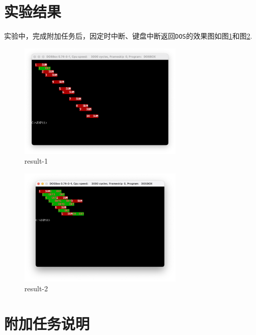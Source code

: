 \documentclass[11pt]{SEU-Digital-Report}
\begin{document}
\section{实验结果}
实验中，完成附加任务后，因定时中断、键盘中断返回\texttt{DOS}的效果图如图\ref{fig:rst1}和图\ref{fig:rst2}.
\begin{figure}[htbp]
    \centering
    \includegraphics[width=0.7\textwidth]{fig/rst1.png}
    \caption{result-1}
    \label{fig:rst1}
\end{figure}

\begin{figure}[htbp]
    \centering
    \includegraphics[width=0.7\textwidth]{fig/rst2.png}
    \caption{result-2}
    \label{fig:rst2}
\end{figure}

\section{附加任务说明}
\end{document}
